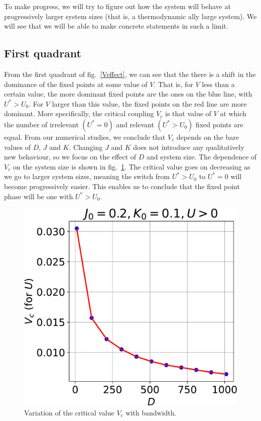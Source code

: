 \documentclass[12pt,twoside]{article}
\numberwithin{equation}{section}
\begin{document}
To make progress, we will try to figure out how the system will behave at progressively larger system sizes (that is, a thermodynamic ally large system). We will see that we will be able to make concrete statements in such a limit.

\subsection{First quadrant}
From the first quadrant of fig.~\ref{Veffect}, we can see that the there is a shift in the dominance of the fixed points at some value of $V$. That is, for $V$ less than a certain value, the more dominant fixed points are the ones on the blue line, with $U^* > U_0$. For $V$ larger than this value, the fixed points on the red line are more dominant. More specifically, the critical coupling \(V_c\) is that value of \(V\) at which the number of irrelevant \((U^* = 0)\) and relevant \((U^* > U_0)\) fixed points are equal. From our numerical studies, we conclude that \(V_c\) depends on the bare values of \(D\), \(J\) and \(K\). Changing \(J\) and \(K\) does not introduce any qualitatively new behaviour, so we focus on the effect of $D$ and system size.
\pb The dependence of $V_c$ on the system size is shown in fig.~\ref{Vc_vs_D}. The critical value goes on decreasing as we go to larger system sizes, meaning the switch from \(U^* > U_0\) to \(U^*=0\) will become progressively easier. This enables us to conclude that the fixed point phase will be one with \(U^* > U_0\).
\begin{figure}[htbp]
	\centering
	\includegraphics[scale=0.39]{../figures/Vc_q1.pdf}
	\caption{Variation of the critical value \(V_c\) with bandwidth. }
	\label{Vc_vs_D}
\end{figure}
\end{document}
